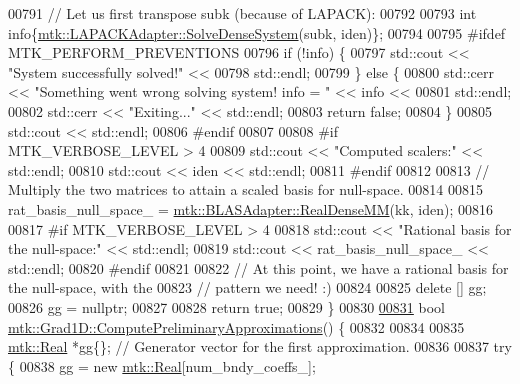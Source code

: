 \begin{DoxyCode}
{{00791   \textcolor{comment}{// Let us first transpose subk (because of LAPACK):}
00792 
00793   \textcolor{keywordtype}{int} info\{\hyperlink{classmtk_1_1LAPACKAdapter_a7428bccf74fd4a4af68fb7233846da22}{mtk::LAPACKAdapter::SolveDenseSystem}(subk, iden)\};
00794 
00795 \textcolor{preprocessor}{  #ifdef MTK\_PERFORM\_PREVENTIONS}
00796   \textcolor{keywordflow}{if} (!info) \{
00797     std::cout << \textcolor{stringliteral}{"System successfully solved!"} <<
00798       std::endl;
00799   \} \textcolor{keywordflow}{else} \{
00800     std::cerr << \textcolor{stringliteral}{"Something went wrong solving system! info = "} << info <<
00801       std::endl;
00802     std::cerr << \textcolor{stringliteral}{"Exiting..."} << std::endl;
00803     \textcolor{keywordflow}{return} \textcolor{keyword}{false};
00804   \}
00805   std::cout << std::endl;
00806 \textcolor{preprocessor}{  #endif}
00807 
00808 \textcolor{preprocessor}{  #if MTK\_VERBOSE\_LEVEL > 4}
00809   std::cout << \textcolor{stringliteral}{"Computed scalers:"} << std::endl;
00810   std::cout << iden << std::endl;
00811 \textcolor{preprocessor}{  #endif}
00812 
00813   \textcolor{comment}{// Multiply the two matrices to attain a scaled basis for null-space.}
00814 
00815   rat\_basis\_null\_space\_ = \hyperlink{classmtk_1_1BLASAdapter_acebd0e9bfe0bdd609c7fbea98ccfd3b5}{mtk::BLASAdapter::RealDenseMM}(kk, iden);
00816 
00817 \textcolor{preprocessor}{  #if MTK\_VERBOSE\_LEVEL > 4}
00818   std::cout << \textcolor{stringliteral}{"Rational basis for the null-space:"} << std::endl;
00819   std::cout << rat\_basis\_null\_space\_ << std::endl;
00820 \textcolor{preprocessor}{  #endif}
00821 
00822   \textcolor{comment}{// At this point, we have a rational basis for the null-space, with the}
00823   \textcolor{comment}{// pattern we need! :)}
00824 
00825   \textcolor{keyword}{delete} [] gg;
00826   gg = \textcolor{keyword}{nullptr};
00827 
00828   \textcolor{keywordflow}{return} \textcolor{keyword}{true};
00829 \}
00830 
\hypertarget{mtk__grad__1d_8cc_source_l00831}{}\hyperlink{classmtk_1_1Grad1D_add4c68a6e78d8b9c2b800b3f96f4757d}{00831} \textcolor{keywordtype}{bool} \hyperlink{classmtk_1_1Grad1D_add4c68a6e78d8b9c2b800b3f96f4757d}{mtk::Grad1D::ComputePreliminaryApproximations}() \{
00832 
00834 
00835   \hyperlink{group__c01-roots_gac080bbbf5cbb5502c9f00405f894857d}{mtk::Real} *gg\{\}; \textcolor{comment}{// Generator vector for the first approximation.}
00836 
00837   \textcolor{keywordflow}{try} \{
00838     gg = \textcolor{keyword}{new} \hyperlink{group__c01-roots_gac080bbbf5cbb5502c9f00405f894857d}{mtk::Real}[num\_bndy\_coeffs\_];
}}
\end{DoxyCode}
